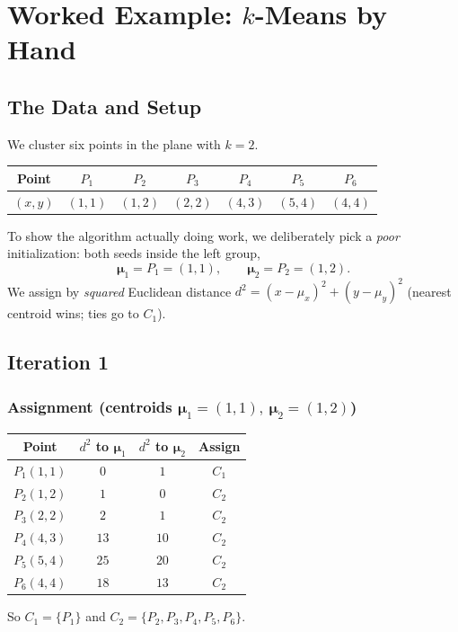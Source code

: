 \documentclass[11pt,a4paper]{report}
\theoremstyle{definition}
\theoremstyle{plain}
\theoremstyle{remark}
\newcommand{\vmu}{\bm{\mu}}
\begin{document}
	\chapter{Worked Example: $k$-Means by Hand}
	\label{ch:worked}
	
	\section{The Data and Setup}
	We cluster six points in the plane with $k=2$.
	\begin{center}
		\begin{tabular}{@{}ccccccc@{}}
			\toprule
			Point & $P_1$ & $P_2$ & $P_3$ & $P_4$ & $P_5$ & $P_6$\\
			\midrule
			$(x,y)$ & $(1,1)$ & $(1,2)$ & $(2,2)$ & $(4,3)$ & $(5,4)$ & $(4,4)$\\
			\bottomrule
		\end{tabular}
	\end{center}
	To show the algorithm actually doing work, we deliberately pick a \emph{poor}
	initialization: both seeds inside the left group,
	\[
	\vmu_1=P_1=(1,1),\qquad \vmu_2=P_2=(1,2).
	\]
	We assign by \emph{squared} Euclidean distance
	$d^2=(x-\mu_x)^2+(y-\mu_y)^2$ (nearest centroid wins; ties go to $C_1$).
	
	\section{Iteration 1}
	\subsection*{Assignment (centroids $\vmu_1=(1,1),\ \vmu_2=(1,2)$)}
	\begin{center}
		\begin{tabular}{@{}cccc@{}}
			\toprule
			Point & $d^2$ to $\vmu_1$ & $d^2$ to $\vmu_2$ & Assign\\
			\midrule
			$P_1(1,1)$ & $0$  & $1$  & $C_1$\\
			$P_2(1,2)$ & $1$  & $0$  & $C_2$\\
			$P_3(2,2)$ & $2$  & $1$  & $C_2$\\
			$P_4(4,3)$ & $13$ & $10$ & $C_2$\\
			$P_5(5,4)$ & $25$ & $20$ & $C_2$\\
			$P_6(4,4)$ & $18$ & $13$ & $C_2$\\
			\bottomrule
		\end{tabular}
	\end{center}
	So $C_1=\{P_1\}$ and $C_2=\{P_2,P_3,P_4,P_5,P_6\}$.
	
\end{document}
